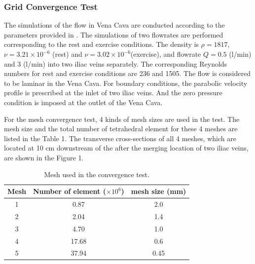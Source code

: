 \subsubsection*{Grid Convergence Test}

The simulations of the flow in Vena Cava are conducted according to the parameters provided in \cite{craven_cfd}. The simulations of two flowrates are performed corresponding to the rest and exercise conditions. The density is $\rho=1817$, $\nu=3.21\times10^{-6}$ (rest) and $\nu=3.02\times10^{-6}$(exercise), and flowrate $Q= 0.5$ (l/min) and $3$ (l/min) into two iliac veins separately. The corresponding Reynolds numbers for rest and exercise conditions are 236 and 1505. The flow is considered to be laminar in the Vena Cava.
For boundary conditions, the parabolic velocity profile is prescribed at the inlet of two iliac veins. And the zero pressure condition is imposed at the outlet of the Vena Cava. 

For the mesh convergence test, 4 kinds of mesh sizes are used in the test. The mesh size and the total number of tetrahedral element for these 4 meshes are listed in the Table 1. The transverse cross-sections of all 4 meshes, which are located at 10 cm downstream of the after the merging location of two iliac veins, are shown in the Figure 1.

\begin{table}[h]
\caption {Mesh used in the convergence test.} \label{tab:meshsize}
\centering
\begin{tabular}{|c|c|c|}
\hline
Mesh & Number of element ($\times10^6$)& mesh size (mm) \\ \hline
1    & 0.87              & 2.0              \\ \hline
2    & 2.04              & 1.4            \\ \hline
3    & 4.70              & 1.0               \\ \hline
4    & 17.68             & 0.6            \\ \hline
5    & 37.94             & 0.45            \\ \hline
\end{tabular}
\end{table}

